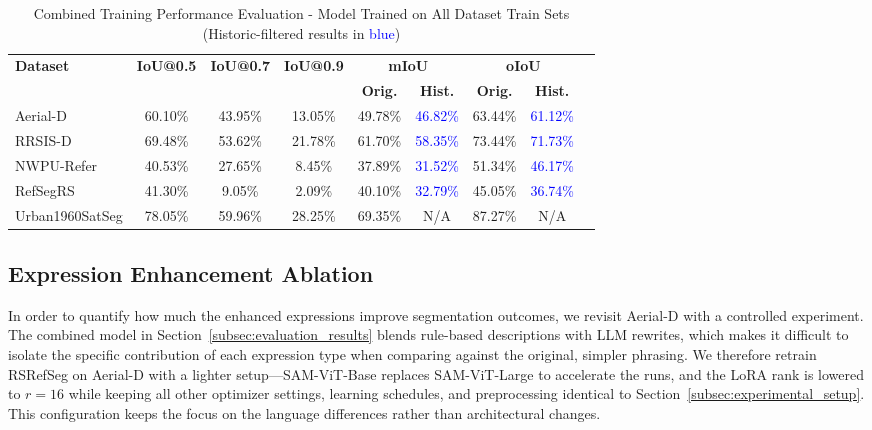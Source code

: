 \begin{table}[t]
\centering
\caption{Combined Training Performance Evaluation - Model Trained on All Dataset Train Sets (Historic-filtered results in \textcolor{blue}{blue})}
\label{tab:combined_training_results}
\begin{tabular}{@{}lcccccccc@{}}
\toprule
\textbf{Dataset} & \textbf{IoU@0.5} & \textbf{IoU@0.7} & \textbf{IoU@0.9} & \multicolumn{2}{c}{\textbf{mIoU}} & \multicolumn{2}{c}{\textbf{oIoU}} \\
\cmidrule(lr){5-6} \cmidrule(lr){7-8}
 & & & & \textbf{Orig.} & \textbf{Hist.} & \textbf{Orig.} & \textbf{Hist.} \\
\midrule
Aerial-D & 60.10\% & 43.95\% & 13.05\% & 49.78\% & \textcolor{blue}{46.82\%} & 63.44\% & \textcolor{blue}{61.12\%} \\
RRSIS-D & 69.48\% & 53.62\% & 21.78\% & 61.70\% & \textcolor{blue}{58.35\%} & 73.44\% & \textcolor{blue}{71.73\%} \\
NWPU-Refer & 40.53\% & 27.65\% & 8.45\% & 37.89\% & \textcolor{blue}{31.52\%} & 51.34\% & \textcolor{blue}{46.17\%} \\
RefSegRS & 41.30\% & 9.05\% & 2.09\% & 40.10\% & \textcolor{blue}{32.79\%} & 45.05\% & \textcolor{blue}{36.74\%} \\
Urban1960SatSeg & 78.05\% & 59.96\% & 28.25\% & 69.35\% & N/A & 87.27\% & N/A \\
\bottomrule
\end{tabular}
\end{table}

\subsection{Expression Enhancement Ablation}
\label{subsec:ablation_studies}

In order to quantify how much the enhanced expressions improve segmentation outcomes, we revisit Aerial-D with a controlled experiment. The combined model in Section~\ref{subsec:evaluation_results} blends rule-based descriptions with LLM rewrites, which makes it difficult to isolate the specific contribution of each expression type when comparing against the original, simpler phrasing. We therefore retrain RSRefSeg on Aerial-D with a lighter setup—SAM-ViT-Base replaces SAM-ViT-Large to accelerate the runs, and the LoRA rank is lowered to \(r=16\) while keeping all other optimizer settings, learning schedules, and preprocessing identical to Section~\ref{subsec:experimental_setup}. This configuration keeps the focus on the language differences rather than architectural changes.

